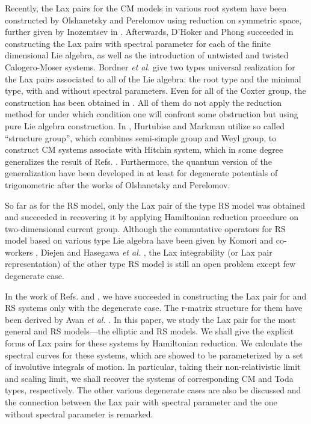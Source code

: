 \documentclass[a4paper,12pt]{article}
\begin{document}
Recently, the Lax pairs for the CM models in various root system have
been constructed by Olshanetsky and Perelomov\cite{op} using
reduction on symmetric space, further given by Inozemtsev in
\cite{in}. Afterwards, D'Hoker and Phong\cite{hp1} succeeded in	 constructing
the Lax pairs with spectral parameter for each of the finite
dimensional Lie algebra,  as well as the introduction of
untwisted and twisted Calogero-Moser systems. Bordner
\textit{et al.}\cite{bcs,bcs2,bcs3} give two types
universal realization  for the Lax pairs associated
to all of the Lie algebra: the root type and the minimal
type, with and without spectral parameters.
Even for  all of the Coxter group, the construction has been
obtained in \cite{bcs1}.  All of them do not apply the reduction method
for under which condition one will confront some obstruction\cite{hm}
but using pure Lie algebra construction. In \cite {hm},
Hurtubise and Markman utilize so called ``structure group'',
which combines semi-simple group and Weyl group, to
construct CM systems associate with Hitchin system, which in
some degree generalizes the result of Refs.
\cite{hp1,bcs,bcs2,bcs3,bcs1}. Furthermore, the quantum
version of the generalization have been developed in
\cite{bms,kps} at least	 for degenerate potentials of
trigonometric after  the works of Olshanetsky and Perelomov\cite{op1}.

So far as for the RS model, only the Lax
pair of the \coordHE{} type RS model was obtained \cite{r1,nksr,bc,kz,s1,s2} and
succeeded in recovering it  by applying
Hamiltonian reduction procedure on two-dimensional current
group\cite{aru}. Although the
commutative operators for RS model based on various type Lie
algebra have been given by Komori and co-workers
\cite{ko1,ko2}, Diejen\cite{di,di1} and Hasegawa \textit{et
al.} \cite{h1,h2}, the Lax integrability (or Lax pair representation)
of the other type RS model is still an open problem\cite{bm1}
except few  degenerate case\cite{kai3,Che00}.


In the work of Refs. \cite{kai3} and \cite{Che00}, we have
succeeded in constructing the Lax pair for \coordHE{} and \coordHE{} RS systems
only with the degenerate case. The r-matrix structure for them have been
derived by Avan \textit{et al.} \cite{Avan}. In this paper, we study
the Lax pair for the most general  \coordHE{} and \coordHE{} RS models---the
elliptic  \coordHE{} and \coordHE{} RS models.
We shall give the explicit forms of Lax pairs
for these systems by Hamiltonian reduction. We calculate the
spectral curves for these systems, which are showed to be
parameterized by a set of involutive integrals of motion. In
particular, taking their non-relativistic limit and scaling
limit, we shall recover the systems of corresponding CM and
Toda types, respectively. The other various
degenerate cases are also be discussed and the connection
between the Lax pair with spectral parameter and the one
without spectral parameter is remarked.
\end{document}
